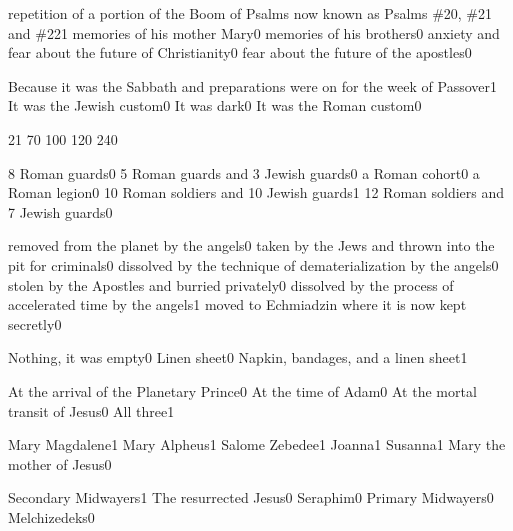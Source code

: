{repetition of a portion of the Boom of Psalms now known as Psalms \#20, \#21 and \#22}{1}
{memories of his mother Mary}{0}
{memories of his brothers}{0}
{anxiety and fear about the future of Christianity}{0}
{fear about the future of the apostles}{0}
\qstop


{Because it was the Sabbath and preparations were on for the week of Passover}{1}
{It was the Jewish custom}{0}
{It was dark}{0}
{It was the Roman custom}{0}
\qstop

{2}{1}
{7}{0}
{10}{0}
{12}{0}
{24}{0}
\qstop

{8 Roman guards}{0}
{5 Roman guards and 3 Jewish guards}{0}
{a Roman cohort}{0}
{a Roman legion}{0}
{10 Roman soldiers and 10 Jewish guards}{1}
{12 Roman soldiers and 7 Jewish guards}{0}
\qstop


{removed from the planet by the angels}{0}
{taken by the Jews and thrown into the pit for criminals}{0}
{dissolved by the technique of dematerialization by the angels}{0}
{stolen by the Apostles and burried privately}{0}
{dissolved by the process of accelerated time by the angels}{1}
{moved to Echmiadzin where it is now kept secretly}{0}
\qstop

{Nothing, it was empty}{0}
{Linen sheet}{0}
{Napkin, bandages, and a linen sheet}{1}
\qstop

{At the arrival of the Planetary Prince}{0}
{At the time of Adam}{0}
{At the mortal transit of Jesus}{0}
{All three}{1}
\qstop

{Mary Magdalene}{1}
{Mary Alpheus}{1}
{Salome Zebedee}{1}
{Joanna}{1}
{Susanna}{1}
{Mary the mother of Jesus}{0}
\qstop

{Secondary Midwayers}{1}
{The resurrected Jesus}{0}
{Seraphim}{0}
{Primary Midwayers}{0}
{Melchizedeks}{0}
\qstop

